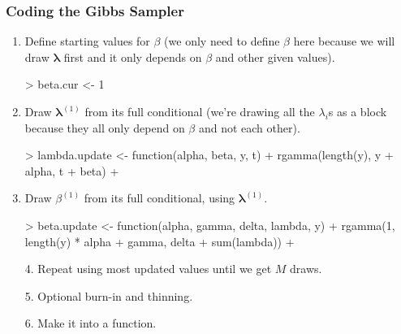 \documentclass[handout]{beamer}
\begin{document}
\begin{frame}[fragile]
\frametitle{Coding the Gibbs Sampler}
\pause
\begin{enumerate}
\item Define starting values for $\beta$ \pause (we only need to define
$\beta$ here because we will draw $\bm{\lambda}$ first and it only
depends on $\beta$ and other given values).
\pause
\tiny
\medskip
\begin{Schunk}
\begin{Sinput}
> beta.cur <- 1
\end{Sinput}
\end{Schunk}
\bigskip
\normalsize
\pause
\item Draw $\bm{\lambda}^{(1)}$ from its full conditional \pause (we're
drawing all the $\lambda_i$s as a block because they all only depend
on $\beta$ and not each other). 
\tiny
\medskip
\pause
\begin{Schunk}
\begin{Sinput}
> lambda.update <- function(alpha, beta, y, t) {
+     rgamma(length(y), y + alpha, t + beta)
+ }
\end{Sinput}
\end{Schunk}
\normalsize
\bigskip
\pause
\item Draw $\beta^{(1)}$ from its full conditional, using $\bm{\lambda}^{(1)}$.
\medskip
\tiny
\pause
\begin{Schunk}
\begin{Sinput}
> beta.update <- function(alpha, gamma, delta, lambda, y) {
+     rgamma(1, length(y) * alpha + gamma, delta + sum(lambda))
+ }
\end{Sinput}
\end{Schunk}
\normalsize
\end{enumerate}

\end{frame}

\begin{frame}[fragile]
\begin{enumerate}
\item [4.] Repeat using most updated values until we get $M$ draws.
\pause
\bigskip
\item [5.] Optional burn-in and thinning.
\bigskip
\pause
\item [6.] Make it into a function.
\end{enumerate}
\end{frame}
\end{document}
